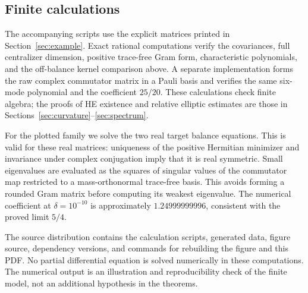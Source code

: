 \subsection{Finite calculations}
The accompanying scripts use the explicit matrices printed in
Section~\ref{sec:example}. Exact rational computations verify the
covariances, full centralizer dimension, positive trace-free Gram
form, characteristic polynomials, and the off-balance kernel
comparison above. A separate implementation forms the raw complex
commutator matrix in a Pauli basis and verifies the same six-mode
polynomial and the coefficient $25/20$. These calculations check
finite algebra; the proofs of HE existence and relative elliptic
estimates are those in Sections~\ref{sec:curvature}--\ref{sec:spectrum}.

For the plotted family we solve the two real target balance equations.
This is valid for these real matrices: uniqueness of the positive
Hermitian minimizer and invariance under complex conjugation imply
that it is real symmetric. Small eigenvalues are evaluated as the
squares of singular values of the commutator map restricted to a
mass-orthonormal trace-free basis. This avoids forming a rounded
Gram matrix before computing its weakest eigenvalue.
The numerical coefficient at $\delta=10^{-10}$ is approximately
$1.24999999996$, consistent with the proved limit $5/4$.

The source distribution contains the calculation scripts, generated
data, figure source, dependency versions, and commands for rebuilding
the figure and this PDF. No partial differential equation is solved
numerically in these computations. The numerical output is an
illustration and reproducibility check of the finite model, not an
additional hypothesis in the theorems.
